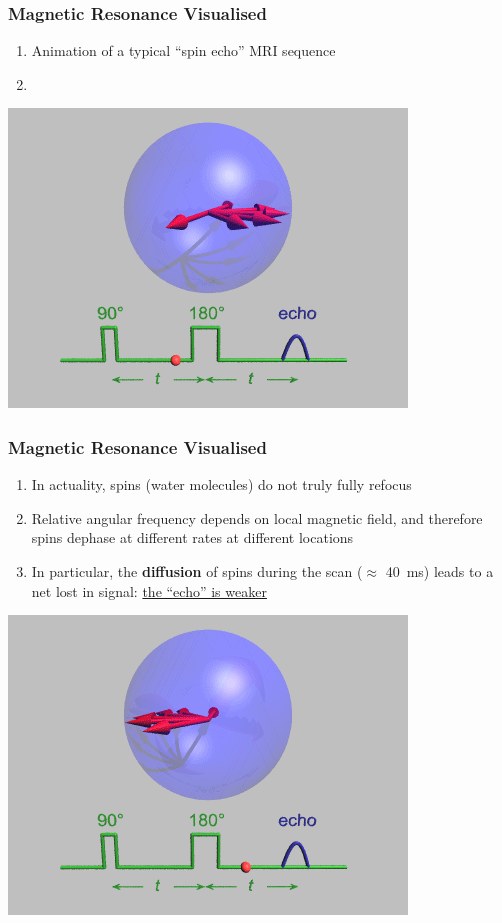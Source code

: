 \begin{frame}
\frametitle{Magnetic Resonance Visualised}
\begin{enumerate}
    \item Animation of a typical ``spin echo'' MRI sequence
    \item {} %
\end{enumerate}
\centering
\includegraphics[width=0.7\linewidth]{gifs/HahnEcho_GWM-100}
\end{frame}

\begin{frame}
\frametitle{Magnetic Resonance Visualised}
\begin{enumerate}
    \item In actuality, spins (water molecules) do not truly fully refocus
    \item Relative angular frequency depends on local magnetic field, and therefore spins dephase at different rates at different locations
    \item In particular, the \textbf{diffusion} of spins during the scan ($\approx$ \SI{40}{\milli\second}) leads to a net lost in signal: \underline{the ``echo'' is weaker}
\end{enumerate}
\centering
\includegraphics[width=0.4\linewidth]{gifs/HahnEcho_GWM-165}
\end{frame}


